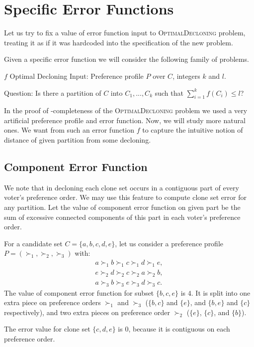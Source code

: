 \section{Specific Error Functions}

Let us try to fix a value of error function input to \textsc{OptimalDecloning} problem,
treating it as if it was hardcoded into the specification of the new problem.

Given a specific error function we will consider the following family of problems.

\begin{problem}{ $f$ Optimal Decloning}
	Input: Preference profile $P$ over $C$, integers $k$ and $l$.

	Question: Is there a partition of $C$ into $C_1, ..., C_k$ such that $\sum_{i=1}^k f(C_i) \leq l$?
\end{problem}

In the proof of \np-completeness of the \textsc{OptimalDecloning} problem
we used a very artificial preference profile and error function.
Now, we will study more natural ones.
We want from such an error function $f$ to capture the intuitive notion
of distance of given partition from some decloning.

\subsection{Component Error Function}

We note that in decloning each clone set occurs in a contiguous part of every voter's preference order.
We may use this feature to compute clone set error for any partition.
Let the value of component error function on given part be the sum of excessive connected components
of this part in each voter's preference order.

\begin{exmp}
For a candidate set $C = \{a, b, c, d, e\}$,
let us consider a preference profile $P = (\succ_1, \succ_2, \succ_3)$ with:
\begin{align*}
a \succ_1 b \succ_1 c \succ_1 d \succ_1 e,\\
e \succ_2 d \succ_2 c \succ_2 a \succ_2 b,\\
a \succ_3 b \succ_3 e \succ_3 d \succ_3 c.
\end{align*}
The value of component error function for subset $\{b,c,e\}$ is $4$.
It is split into one extra piece on preference orders $\succ_1$ and $\succ_3$
($\{b,c\}$ and $\{e\}$, and $\{b,e\}$ and $\{c\}$ respectively),
and two extra pieces on preference order $\succ_2$ ($\{e\}$, $\{c\}$, and $\{b\}$).

The error value for clone set $\{c, d, e\}$ is $0$,
because it is contiguous on each preference order.
\end{exmp}

